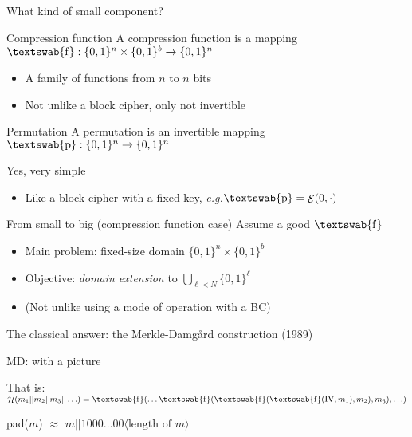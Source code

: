 \documentclass[xcolor=table,usenames,dvipsnames,compress]{beamer}
\newcommand\eg{\emph{e.g.}\xspace}
\DeclareMathOperator\hash{\mathcal{H}}
\DeclareMathOperator\E{\mathcal{E}}
\DeclareMathOperator\cf{\textswab{f}}
\DeclareMathOperator\perm{\textswab{p}}
\newcommand\iv{\text{IV}}
\begin{document}
\begin{frame}{What kind of small component?}
\begin{exampleblock}{Compression function}
A compression function is a mapping $\cf : \{0,1\}^n \times \{0,1\}^b \rightarrow \{0,1\}^n$
\end{exampleblock}
\begin{itemize}
\item A family of functions from $n$ to $n$ bits
\item Not unlike a block cipher, only not invertible
\end{itemize}
\begin{exampleblock}{Permutation}
A permutation is an invertible mapping $\perm : \{0,1\}^n \rightarrow \{0,1\}^n$
\end{exampleblock}
{\footnotesize Yes, very simple}
\begin{itemize}
\item Like a block cipher with a fixed key, \eg $\perm = \E(0,\cdot)$
\end{itemize}
\end{frame}

\begin{frame}{From small to big (compression function case)}
Assume a good $\cf$

\medskip

\begin{itemize}
\item Main problem: fixed-size domain $\{0,1\}^n \times \{0,1\}^b$
\item Objective: \emph{domain extension} to $\bigcup_{\ell < N} \{0,1\}^\ell$
\item (Not unlike using a mode of operation with a BC)
\end{itemize}

\medskip

The classical answer: the Merkle-Damg\aa rd construction (1989)
\end{frame}

\begin{frame}{MD: with a picture}
\begin{figure}
	
\end{figure}

That is: $\hash(m_1||m_2||m_3||\ldots) = \cf(\ldots\cf(\cf(\cf(\iv, m_1), m_2), m_3), \ldots)$

\medskip

pad($m$) $\approx$ $m||1000\ldots00\langle\text{length of }m\rangle$
\end{frame}
\end{document}
